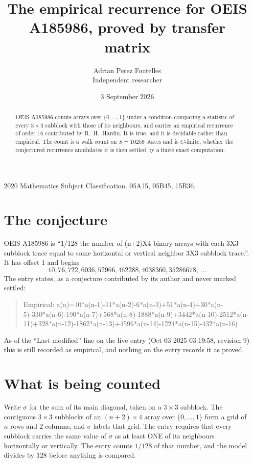 \documentclass[11pt,a4paper]{article}
\title{The empirical recurrence for OEIS A185986, proved by transfer matrix}
\author{Adrian Perez Fontelles\\ \small Independent researcher}
\date{3 September 2026}
\theoremstyle{plain}
\theoremstyle{definition}
\begin{document}
\maketitle

\begin{abstract}
OEIS A185986 counts arrays over $\{0,\dots,1\}$ under a condition comparing a statistic of
every $3\times3$ subblock with those of its neighbours, and carries an empirical recurrence
of order $16$ contributed by R.~H.~Hardin. It is true, and it is decidable rather than
empirical. The count is a walk count on $S=10256$ states and is $C$-finite; whether the
conjectured recurrence annihilates it is then settled by a finite exact computation.
\end{abstract}

\noindent\small 2020 Mathematics Subject Classification. 05A15, 05B45, 15B36.\normalsize

\section{The conjecture}

OEIS A185986 is ``1/128 the number of (n+2)X4 binary arrays with each 3X3 subblock trace equal to some horizontal or vertical neighbor 3X3 subblock trace.''. It has offset $1$ and begins
\[
10, 76, 722, 6036, 52966, 462288, 4038360, 35286678,\ \dots
\]
The entry states, as a conjecture contributed by its author and never marked settled:
\begin{quote}
Empirical: a(n)=10*a(n-1)-11*a(n-2)-6*a(n-3)+51*a(n-4)+30*a(n-5)-330*a(n-6)-190*a(n-7)+568*a(n-8)-1888*a(n-9)+3442*a(n-10)-2512*a(n-11)+328*a(n-12)-1862*a(n-13)+4596*a(n-14)-1224*a(n-15)-432*a(n-16)
\end{quote}
As of the ``Last modified'' line on the live entry (Oct 03 2025 03:19:58, revision 9) this is still
recorded as empirical, and nothing on the entry records it as proved.

\section{What is being counted}

Write $\sigma$ for the sum of its main diagonal, taken on a $3\times3$ subblock. The contiguous $3\times3$
subblocks of an $(n+2)\times4$ array over $\{0,\dots,1\}$ form a grid of $n$ rows
and $2$ columns, and $\sigma$ labels that grid. The entry
requires that every subblock carries the same value of $\sigma$ as at least ONE of its neighbours horizontally or vertically. The entry counts $1/128$ of that number, and the model divides by $128$ before anything is compared.
\end{document}

